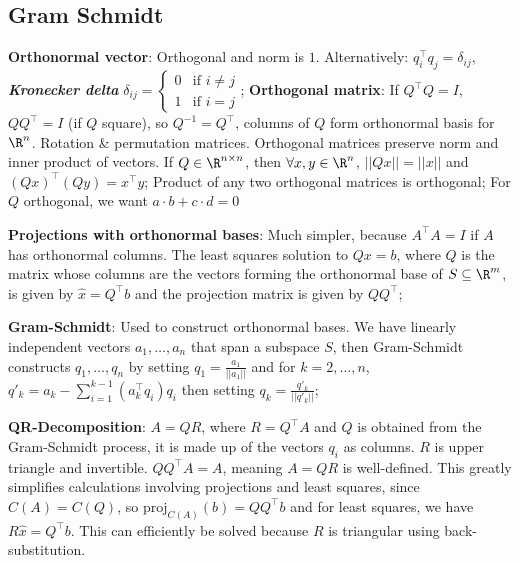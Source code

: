 \newsectionNoPB
\subsection{Gram Schmidt}
\shortdef \textbf{Orthonormal vector}: Orthogonal and norm is $1$.
Alternatively: $q_i^{\top}q_j = \delta_{ij}$, \textbf{\textit{Kronecker delta}} $\delta_{ij} = \begin{cases}
        0 & \text{if } i \neq j \\
        1 & \text{if } i = j
    \end{cases}$;
\setcounter{all}{3}\shortdef \textbf{Orthogonal matrix}:
If $Q^{\top}Q = I$, $QQ^{\top} = I$ (if $Q$ square), so $Q^{-1} = Q^{\top}$, columns of $Q$ form orthonormal basis for $\R^n$. \shortex \hspace{0mm} Rotation \& permutation matrices. \setcounter{all}{6}\shortproposition Orthogonal matrices preserve norm and inner product of vectors.
If $Q\in \R^{n \times n}$, then $\forall x, y \in \R^n$, $||Qx|| = ||x||$ and $(Qx)^{\top}(Qy) = x^{\top}y$;
Product of any two orthogonal matrices is orthogonal; For $Q$ orthogonal, we want $a \cdot b + c \cdot d = 0$

\textbf{Projections with orthonormal bases}: Much simpler, because $A^{\top}A = I$ if $A$ has orthonormal columns.
\shortproposition The least squares solution to $Qx = b$, where $Q$ is the matrix whose columns are the vectors forming the orthonormal base of $S \subseteq \R^m$, is given by $\hat{x} = Q^{\top}b$ and the projection matrix is given by $QQ^{\top}$;

\setcounter{all}{9}\shortdef \textbf{Gram-Schmidt}: Used to construct orthonormal bases. We have linearly independent vectors $a_1, \ldots, a_n$ that span a subspace $S$, then Gram-Schmidt constructs $q_1, \ldots, q_n$ by setting $q_1 = \frac{a_1}{||a_1||}$ and for $k = 2, \ldots, n$, $q'_k = a_k - \sum_{i = 1}^{k - 1} (a_k^{\top}q_i) q_i$ then setting $q_k = \frac{q'_k}{||q'_k||}$;

\setcounter{all}{11}\shortdef \textbf{QR-Decomposition}: $A = QR$, where $R = Q^{\top}A$ and $Q$ is obtained from the Gram-Schmidt process, it is made up of the vectors $q_i$ as columns. \shortlemma $R$ is upper triangle and invertible. $QQ^{\top}A = A$, meaning $A = QR$ is well-defined. \shortfact This greatly simplifies calculations involving projections and least squares, since $C(A) = C(Q)$, so $\text{proj}_{C(A)}(b) = QQ^{\top}b$ and for least squares, we have $R\hat{x} = Q^{\top}b$. This can efficiently be solved because $R$ is triangular using back-substitution.


